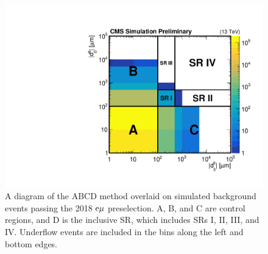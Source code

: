 \begin{figure}[hbtp]
\centering
\includegraphics[scale=0.5]{figures/bg/abcdMethod_CMSPreliminary.pdf}
\caption{
A diagram of the ABCD method overlaid on simulated background events passing the 2018 $\mathrm{e}{\mu}$ preselection. A, B, and C are control regions, and D is the inclusive SR, which includes SRs I, II, III, and IV. Underflow events are included in the bins along the left and bottom edges. 
}
\label{abcd_regions}
\end{figure}